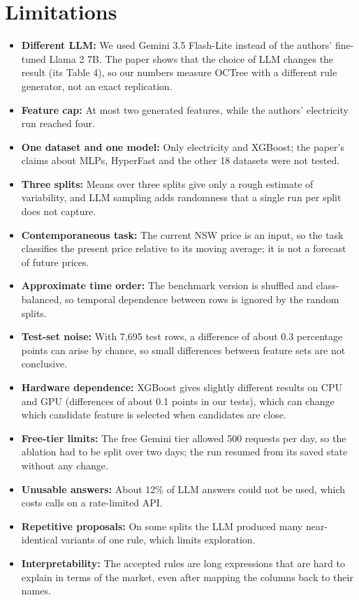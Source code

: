 \documentclass[11pt]{article}
\begin{document}
\section{Limitations}\label{sec:limits}
\begin{itemize}
  \item \textbf{Different LLM:} We used Gemini 3.5 Flash-Lite instead of the authors' fine-tuned
        Llama 2 7B. The paper shows that the choice of LLM changes the result (its Table 4), so our
        numbers measure OCTree with a different rule generator, not an exact replication.
  \item \textbf{Feature cap:} At most two generated features, while the authors' electricity run
        reached four.
  \item \textbf{One dataset and one model:} Only electricity and XGBoost; the paper's claims about
        MLPs, HyperFast and the other 18 datasets were not tested.
  \item \textbf{Three splits:} Means over three splits give only a rough estimate of variability, and
        LLM sampling adds randomness that a single run per split does not capture.
  \item \textbf{Contemporaneous task:} The current NSW price is an input, so the task classifies the
        present price relative to its moving average; it is not a forecast of future prices.
  \item \textbf{Approximate time order:} The benchmark version is shuffled and class-balanced, so
        temporal dependence between rows is ignored by the random splits.
\end{itemize}
\begin{itemize}
  \item \textbf{Test-set noise:} With 7,695 test rows, a difference of about 0.3 percentage points can
        arise by chance, so small differences between feature sets are not conclusive.
  \item \textbf{Hardware dependence:} XGBoost gives slightly different results on CPU and GPU
        (differences of about 0.1 points in our tests), which can change which candidate feature is
        selected when candidates are close.
  \item \textbf{Free-tier limits:} The free Gemini tier allowed 500 requests per day, so the ablation
        had to be split over two days; the run resumed from its saved state without any change.
  \item \textbf{Unusable answers:} About 12\% of LLM answers could not be used, which costs calls
        on a rate-limited API.
  \item \textbf{Repetitive proposals:} On some splits the LLM produced many near-identical variants of
        one rule, which limits exploration.
  \item \textbf{Interpretability:} The accepted rules are long expressions that are hard to explain
        in terms of the market, even after mapping the columns back to their names.
\end{itemize}
\end{document}
